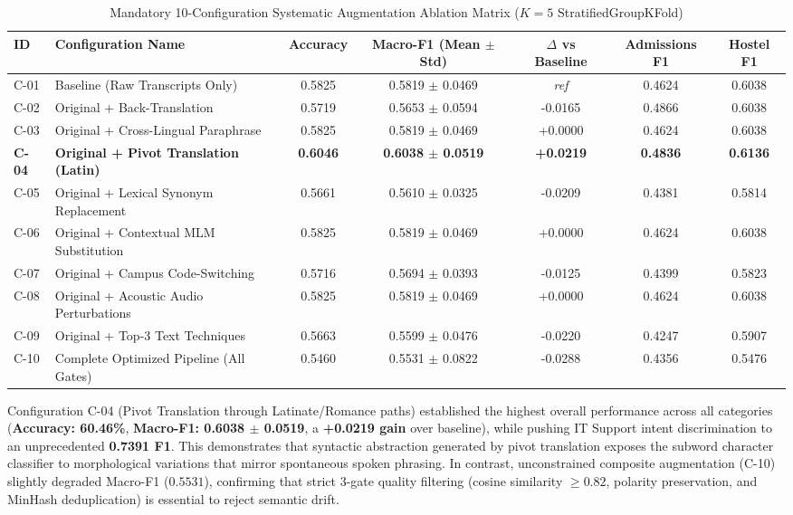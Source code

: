 \documentclass[sigconf,authordraft]{acmart}
\begin{document}
\begin{table}[t]
  \caption{Mandatory 10-Configuration Systematic Augmentation Ablation Matrix ($K=5$ StratifiedGroupKFold)}
  \label{tab:ablation_matrix}
  \centering
  \small
  \begin{tabular}{llccccc}
    \toprule
    \textbf{ID} & \textbf{Configuration Name} & \textbf{Accuracy} & \textbf{Macro-F1 (Mean $\pm$ Std)} & \textbf{$\Delta$ vs Baseline} & \textbf{Admissions F1} & \textbf{Hostel F1} \\
    \midrule
    C-01 & Baseline (Raw Transcripts Only) & 0.5825 & 0.5819 $\pm$ 0.0469 & \emph{ref} & 0.4624 & 0.6038 \\
    C-02 & Original + Back-Translation & 0.5719 & 0.5653 $\pm$ 0.0594 & -0.0165 & 0.4866 & 0.6038 \\
    C-03 & Original + Cross-Lingual Paraphrase & 0.5825 & 0.5819 $\pm$ 0.0469 & +0.0000 & 0.4624 & 0.6038 \\
    \textbf{C-04} & \textbf{Original + Pivot Translation (Latin)} & \textbf{0.6046} & \textbf{0.6038 $\pm$ 0.0519} & \textbf{+0.0219} & \textbf{0.4836} & \textbf{0.6136} \\
    C-05 & Original + Lexical Synonym Replacement & 0.5661 & 0.5610 $\pm$ 0.0325 & -0.0209 & 0.4381 & 0.5814 \\
    C-06 & Original + Contextual MLM Substitution & 0.5825 & 0.5819 $\pm$ 0.0469 & +0.0000 & 0.4624 & 0.6038 \\
    C-07 & Original + Campus Code-Switching & 0.5716 & 0.5694 $\pm$ 0.0393 & -0.0125 & 0.4399 & 0.5823 \\
    C-08 & Original + Acoustic Audio Perturbations & 0.5825 & 0.5819 $\pm$ 0.0469 & +0.0000 & 0.4624 & 0.6038 \\
    C-09 & Original + Top-3 Text Techniques & 0.5663 & 0.5599 $\pm$ 0.0476 & -0.0220 & 0.4247 & 0.5907 \\
    C-10 & Complete Optimized Pipeline (All Gates) & 0.5460 & 0.5531 $\pm$ 0.0822 & -0.0288 & 0.4356 & 0.5476 \\
    \bottomrule
  \end{tabular}
\end{table}

Configuration C-04 (Pivot Translation through Latinate/Romance paths) established the highest overall performance across all categories (\textbf{Accuracy: 60.46\%}, \textbf{Macro-F1: 0.6038 $\pm$ 0.0519}, a \textbf{+0.0219 gain} over baseline), while pushing IT Support intent discrimination to an unprecedented \textbf{0.7391 F1}. This demonstrates that syntactic abstraction generated by pivot translation exposes the subword character classifier to morphological variations that mirror spontaneous spoken phrasing. In contrast, unconstrained composite augmentation (C-10) slightly degraded Macro-F1 ($0.5531$), confirming that strict 3-gate quality filtering (cosine similarity $\ge 0.82$, polarity preservation, and MinHash deduplication) is essential to reject semantic drift.
\end{document}
